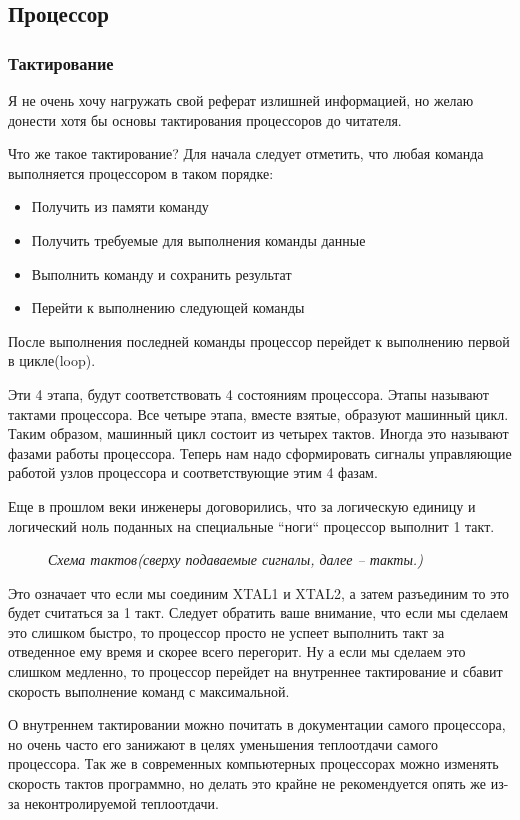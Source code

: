 \documentclass[a4paper, 12pt]{article}
\newcommand{\image}[3]{\begin{figure}[h!]\center{\texttt{[image: \#1]} }\caption{\textit{#3}}\end{figure}}
\begin{document}
\newpage

\subsection{Процессор}
\subsubsection{Тактирование}
Я не очень хочу нагружать свой реферат излишней информацией, но желаю донести 
хотя бы основы тактирования процессоров до читателя.

Что же такое тактирование? Для начала следует отметить, что любая команда 
выполняется процессором в таком порядке:

\begin{itemize}
  \item Получить из памяти команду
  \item Получить требуемые для выполнения команды данные
  \item Выполнить команду и сохранить результат
  \item Перейти к выполнению следующей команды
\end{itemize}

После выполнения последней команды процессор перейдет к выполнению первой в 
цикле(loop). 

Эти 4 этапа, будут соответствовать 4 состояниям процессора. Этапы называют 
тактами процессора. Все четыре этапа, вместе взятые, образуют машинный цикл. 
Таким образом, машинный цикл состоит из четырех тактов. Иногда это называют 
фазами работы процессора. Теперь нам надо сформировать сигналы управляющие 
работой узлов процессора и соответствующие этим 4 фазам.

Еще в прошлом веки инженеры договорились, что за логическую единицу и 
логический ноль поданных на специальные “ноги“ процессор выполнит 1 такт. 

\image{tact.png}{300}{Схема тактов(сверху подаваемые сигналы, далее -- такты.)}

Это означает что если мы соединим XTAL1 и XTAL2, а затем разъединим то это 
будет считаться за 1 такт. Следует обратить ваше внимание, что если мы сделаем 
это слишком быстро, то процессор просто не успеет выполнить такт за отведенное 
ему время и скорее всего перегорит. Ну а если мы сделаем это слишком медленно, 
то процессор перейдет  на внутреннее тактирование и сбавит скорость выполнение 
команд с максимальной.

О внутреннем тактировании можно почитать в документации самого процессора, но 
очень часто его занижают в целях уменьшения теплоотдачи самого процессора. Так 
же в современных компьютерных процессорах можно изменять скорость тактов 
программно, но делать это крайне не рекомендуется опять же из-за 
неконтролируемой теплоотдачи.
\end{document}
